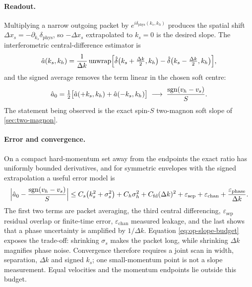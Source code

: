 \paragraph{Readout.} Multiplying a narrow outgoing packet by
$e^{i\delta_{\mathrm{phys}}(k_s,k_h)}$ produces the spatial shift
$\Delta x_s=-\partial_{k_s}\delta_{\mathrm{phys}}$, so $-\Delta x_s$
extrapolated to $k_s=0$ is the desired slope. The interferometric
central-difference estimator is
\begin{equation}
  \hat a(k_s,k_h)=\frac{1}{\Delta k}\operatorname{unwrap}
    \Bigl[\hat\delta\bigl(k_s+\tfrac{\Delta k}{2},k_h\bigr)
         -\hat\delta\bigl(k_s-\tfrac{\Delta k}{2},k_h\bigr)\Bigr],
  \label{eq:op-slope-estimator}
\end{equation}
and the signed average removes the term linear in the chosen soft centre:
\begin{equation}
  \hat a_0=\tfrac12\bigl[\hat a(+k_s,k_h)+\hat a(-k_s,k_h)\bigr]
  \;\longrightarrow\;\frac{\operatorname{sgn}(v_h-v_s)}{S}.
  \label{eq:op-slope-target}
\end{equation}
The statement being observed is the exact spin-$S$ two-magnon soft slope of
\cref{sec:two-magnon}.

\paragraph{Error and convergence.} On a compact hard-momentum set away from the
endpoints the exact ratio has uniformly bounded derivatives, and for symmetric
envelopes with the signed extrapolation a useful error model is
\begin{equation}
  \Bigl|\hat a_0-\frac{\operatorname{sgn}(v_h-v_s)}{S}\Bigr|
  \le C_s\bigl(k_s^2+\sigma_s^2\bigr)+C_h\sigma_h^2+C_{\mathrm{fd}}(\Delta k)^2
     +\varepsilon_{\mathrm{sep}}+\varepsilon_{\mathrm{chan}}
     +\frac{\varepsilon_{\mathrm{phase}}}{\Delta k}.
  \label{eq:op-slope-budget}
\end{equation}
The first two terms are packet averaging, the third central differencing,
$\varepsilon_{\mathrm{sep}}$ residual overlap or finite-time error,
$\varepsilon_{\mathrm{chan}}$ measured leakage, and the last shows that a phase
uncertainty is amplified by $1/\Delta k$. Equation
\eqref{eq:op-slope-budget} exposes the trade-off: shrinking $\sigma_s$ makes
the packet long, while shrinking $\Delta k$ magnifies phase noise. Convergence
therefore requires a joint scan in width, separation, $\Delta k$ and signed
$k_s$; one small-momentum point is not a slope measurement. Equal velocities
and the momentum endpoints lie outside this budget.

